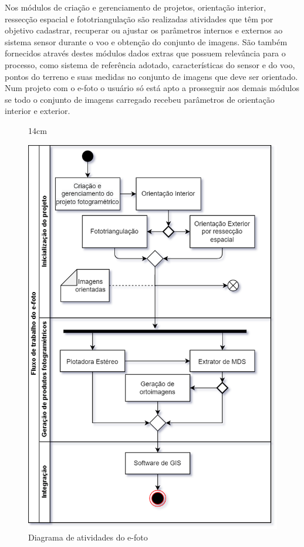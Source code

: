 Nos módulos de criação e gerenciamento de projetos, orientação interior, ressecção espacial e fototriangulação são realizadas atividades que têm por objetivo cadastrar, recuperar ou ajustar os parâmetros internos e externos ao sistema sensor durante o voo e obtenção do conjunto de imagens. São também fornecidos através destes módulos dados extras que possuem relevância para o processo, como sistema de referência adotado, características do sensor e do voo, pontos do terreno e suas medidas no conjunto de imagens que deve ser orientado. Num projeto com o e-foto o usuário só está apto a prosseguir aos demais módulos se todo o conjunto de imagens carregado recebeu parâmetros de orientação interior e exterior.

\begin{figure}[!ht]{14cm}
  \caption{Diagrama de atividades do e-foto} \label{fig:fluxo}
  \includegraphics[width=\hsize]{figuras/Fluxograma_E-foto.png}
\end{figure}

